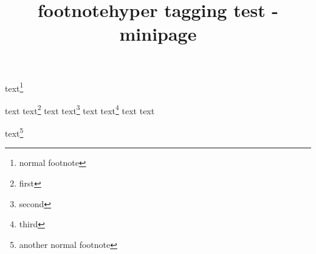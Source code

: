 \documentclass{article}
\title{footnotehyper tagging test - minipage}
\begin{document}
text\footnote{normal footnote}

\begin{savenotes}
\begin{minipage}{3cm}
text text\footnote{first} text text\footnote{second} text text\footnote{third} text text
\end{minipage}
\end{savenotes}

text\footnote{another normal footnote}
\end{document}
